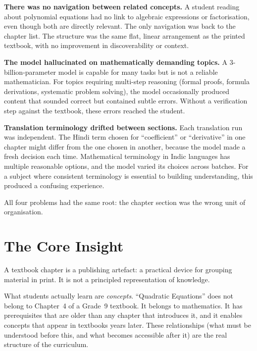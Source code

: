 \documentclass[12pt,a4paper]{article}
\begin{document}
\medskip
\noindent\textbf{There was no navigation between related concepts.}
A student reading about polynomial equations had no link to algebraic expressions or factorisation,
even though both are directly relevant.
The only navigation was back to the chapter list.
The structure was the same flat, linear arrangement as the printed textbook,
with no improvement in discoverability or context.

\medskip
\noindent\textbf{The model hallucinated on mathematically demanding topics.}
A 3-billion-parameter model is capable for many tasks but is not a reliable mathematician.
For topics requiring multi-step reasoning (formal proofs, formula derivations,
systematic problem solving), the model occasionally produced content that sounded correct
but contained subtle errors.
Without a verification step against the textbook, these errors reached the student.

\medskip
\noindent\textbf{Translation terminology drifted between sections.}
Each translation run was independent.
The Hindi term chosen for ``coefficient'' or ``derivative'' in one chapter
might differ from the one chosen in another, because the model made a fresh decision each time.
Mathematical terminology in Indic languages has multiple reasonable options,
and the model varied its choices across batches.
For a subject where consistent terminology is essential to building understanding,
this produced a confusing experience.

\medskip
All four problems had the same root: the chapter section was the wrong unit of organisation.

\section{The Core Insight}

A textbook chapter is a publishing artefact: a practical device for grouping material in print.
It is not a principled representation of knowledge.

What students actually learn are \emph{concepts}.
``Quadratic Equations'' does not belong to Chapter~4 of a Grade~9 textbook.
It belongs to mathematics.
It has prerequisites that are older than any chapter that introduces it,
and it enables concepts that appear in textbooks years later.
These relationships (what must be understood before this, and what becomes accessible
after it) are the real structure of the curriculum.
\end{document}
